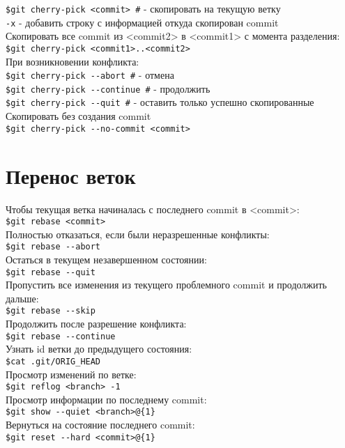 \documentclass[12pt, a4paper]{article}
\begin{document}
\texttt{\$git cherry-pick <commit> \indent\#} - скопировать на текущую ветку \\
\indent\texttt{-x} - добавить строку с информацией откуда скопирован commit \\

\noindent Скопировать все commit из <commit2> в <commit1> с момента разделения: \\
\indent\texttt{\$git cherry-pick <commit1>..<commit2>}\\

\noindent При возникновении конфликта: \\
\indent\texttt{\$git cherry-pick {-}-abort \indent\#} - отмена \\
\indent\texttt{\$git cherry-pick {-}-continue \indent\#} - продолжить \\
\indent\texttt{\$git cherry-pick {-}-quit \indent\#} - оставить только успешно скопированные \\

\noindent Скопировать без создания commit \\
\indent\texttt{\$git cherry-pick {-}-no-commit <commit>} \\



\section{Перенос веток}

Чтобы текущая ветка начиналась с последнего commit в <commit>: \\
\indent\texttt{\$git rebase <commit>} \\
Полностью отказаться, если были неразрешенные конфликты: \\
\indent\texttt{\$git rebase {-}-abort} \\
Остаться в текущем незавершенном состоянии: \\
\indent\texttt{\$git rebase {-}-quit}  \\
Пропустить все изменения из текущего проблемного commit и продолжить дальше: \\
\indent\texttt{\$git rebase {-}-skip } \\


\noindent Продолжить после разрешение конфликта: \\
\indent\texttt{\$git rebase {-}-continue } \\
Узнать id ветки до предыдущего состояния: \\ 
\indent\texttt{\$cat .git/ORIG\_HEAD } \\
Просмотр изменений по ветке: \\
\indent\texttt{\$git reflog <branch> -1}  \\
Просмотр информации по последнему commit: \\
\indent\texttt{\$git show {-}-quiet <branch>{@}\{1\}} \\ 
Вернуться на состояние последнего commit: \\
\indent\texttt{\$git reset {-}-hard <commit>{@}\{1\}} \\ 
\end{document}
